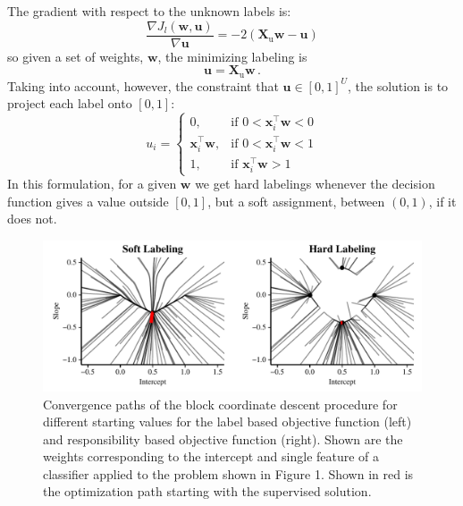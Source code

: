 \documentclass[conference,a4paper,10pt]{IEEEtran}\usepackage[]{graphicx}\usepackage[]{color}
\makeatletter
\def\maxwidth{ %
  \ifdim\Gin@nat@width>\linewidth
    \linewidth
  \else
    \Gin@nat@width
  \fi
}
\newenvironment{knitrout}{}{} %
\makeatother
\begin{document}
The gradient with respect to the unknown labels is:
$$
\frac{\nabla J_l(\mathbf{w},\mathbf{u})}{\nabla \mathbf{u}} = -2 (\mathbf{X}_\text{u} \mathbf{w} - \mathbf{u})
$$
so given a set of weights, $\mathbf{w}$, the minimizing labeling is 
$$\mathbf{u} = \mathbf{X}_\text{u} \mathbf{w} \,.$$
Taking into account, however, the constraint that $\mathbf{u} \in [0,1]^U$, the solution is to project each label onto $[0,1]$:
$$
u_i = 
\begin{cases}
0, & \text{if } 0 < \mathbf{x}_i^\top \mathbf{w} < 0\\
\mathbf{x}_i^\top \mathbf{w}, & \text{if } 0 < \mathbf{x}_i^\top \mathbf{w} < 1\\
1, & \text{if } \mathbf{x}_i^\top \mathbf{w} > 1
\end{cases}
$$
In this formulation, for a given $\mathbf{w}$ we get hard labelings whenever the decision function gives a value outside $[0,1]$, but a soft assignment, between $(0,1)$, if it does not. 


\begin{knitrout}
\color{fgcolor}\begin{figure}
\includegraphics[width=\maxwidth]{figure/attraction1d-1} \caption[Convergence paths of the block coordinate descent procedure for different starting values for the label based objective function (left) and responsibility based objective function (right)]{Convergence paths of the block coordinate descent procedure for different starting values for the label based objective function (left) and responsibility based objective function (right). Shown are the weights corresponding to the intercept and single feature of a classifier applied to the problem shown in Figure 1. Shown in red is the optimization path starting with the supervised solution.}\label{fig:attraction1d}
\end{figure}


\end{knitrout}
\end{document}
